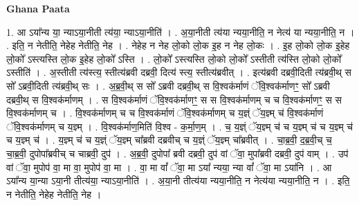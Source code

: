 \documentclass[17pt]{extarticle}
\begin{document}
\textbf{Ghana Paata } \newline

1. आ ऽया᳚न्य या॒ न्याऽया॒नीती त्य॑या॒ न्याऽया॒नीति॑ । . अ॒या॒नीती त्य॑या न्यया॒नीति॒ न नेत्य॑ या न्यया॒नीति॒ न । . इति॒ न नेतीति॒ नेहेह नेतीति॒ नेह । . नेहेह न नेह लो॒को लो॒क इ॒ह न नेह लो॒कः । . इ॒ह लो॒को लो॒क इ॒हेह लो॒को᳚ ऽस्त्यस्ति लो॒क इ॒हेह लो॒को᳚ ऽस्ति । . लो॒को᳚ ऽस्त्यस्ति लो॒को लो॒को᳚ ऽस्तीती त्य॑स्ति लो॒को लो॒को᳚ ऽस्तीति॑ । . अ॒स्तीती त्य॑स्त्य॒ स्तीत्य॑ब्रवी दब्रवी॒ दित्य॑ स्त्य॒ स्तीत्य॑ब्रवीत् । . इत्य॑ब्रवी दब्रवी॒दिती त्य॑ब्रवी॒थ् स सो᳚ ऽब्रवी॒दिती त्य॑ब्रवी॒थ् सः । . अ॒ब्र॒वी॒थ् स सो᳚ ऽब्रवी दब्रवी॒थ् स वि॒श्वक॑र्माणं ॅवि॒श्वक॑र्माणꣳ॒॒ सो᳚ ऽब्रवी दब्रवी॒थ् स वि॒श्वक॑र्माणम् । . स वि॒श्वक॑र्माणं ॅवि॒श्वक॑र्माणꣳ॒॒ स स वि॒श्वक॑र्माणम् च च वि॒श्वक॑र्माणꣳ॒॒ स स वि॒श्वक॑र्माणम् च । . वि॒श्वक॑र्माणम् च च वि॒श्वक॑र्माणं ॅवि॒श्वक॑र्माणम् च य॒ज्ञ्ं ॅय॒ज्ञ्म् च॑ वि॒श्वक॑र्माणं ॅवि॒श्वक॑र्माणम् च य॒ज्ञ्म् । . वि॒श्वक॑र्माण॒मिति॑ वि॒श्व - क॒र्मा॒ण॒म् । . च॒ य॒ज्ञ्ं ॅय॒ज्ञ्म् च॑ च य॒ज्ञ्म् च॑ च य॒ज्ञ्म् च॑ च य॒ज्ञ्म् च॑ । . य॒ज्ञ्म् च॑ च य॒ज्ञ्ं ॅय॒ज्ञ्म् चा᳚ब्रवी दब्रवीच् च य॒ज्ञ्ं ॅय॒ज्ञ्म् चा᳚ब्रवीत् । . चा॒ब्र॒वी॒ द॒ब्र॒वी॒च् च॒ चा॒ब्र॒वी॒ दुपोपा᳚ब्रवीच् च चाब्रवी॒ दुप॑ । . अ॒ब्र॒वी॒ दुपोपा᳚ ब्रवी दब्रवी॒ दुप॑ वां ॅवा॒ मुपा᳚ब्रवी दब्रवी॒ दुप॑ वाम् । . उप॑ वां ॅवा॒ मुपोप॑ वा॒ मा वा॒ मुपोप॑ वा॒ मा । . वा॒ मा वां᳚ ॅवा॒ मा ऽया᳚ न्यया॒ न्या वां᳚ ॅवा॒ मा ऽया॑नि । . आ ऽया᳚न्य या॒न्या ऽया॒नी तीत्य॑या॒ न्याऽया॒नीति॑ । . अ॒या॒नी तीत्य॑या न्यया॒नीति॒ न नेत्य॑या न्यया॒नीति॒ न । . इति॒ न नेतीति॒ नेहेह नेतीति॒ नेह । \newline
\end{document}
